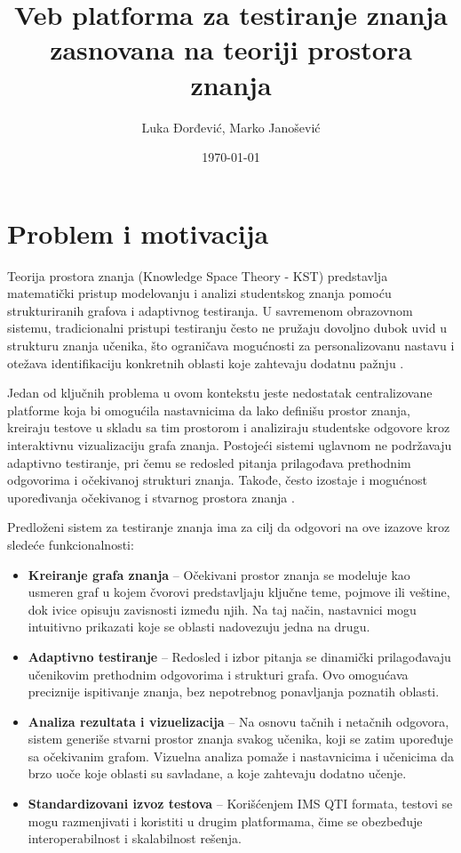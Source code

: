 \documentclass[conference]{IEEEtran}
\title{Veb platforma za testiranje znanja zasnovana na teoriji prostora znanja}
\author{Luka Đorđević, Marko Janošević}
\date{\today}
\begin{document}
\maketitle

\section{Problem i motivacija}

Teorija prostora znanja (Knowledge Space Theory - KST) predstavlja matematički pristup modelovanju i analizi studentskog znanja pomoću strukturiranih grafova i adaptivnog testiranja. U savremenom obrazovnom sistemu, tradicionalni pristupi testiranju često ne pružaju dovoljno dubok uvid u strukturu znanja učenika, što ograničava mogućnosti za personalizovanu nastavu i otežava identifikaciju konkretnih oblasti koje zahtevaju dodatnu pažnju \cite{falmagne2006}.

Jedan od ključnih problema u ovom kontekstu jeste nedostatak centralizovane platforme koja bi omogućila nastavnicima da lako definišu prostor znanja, kreiraju testove u skladu sa tim prostorom i analiziraju studentske odgovore kroz interaktivnu vizualizaciju grafa znanja. Postojeći sistemi uglavnom ne podržavaju adaptivno testiranje, pri čemu se redosled pitanja prilagođava prethodnim odgovorima i očekivanoj strukturi znanja. Takođe, često izostaje i mogućnost upoređivanja očekivanog i stvarnog prostora znanja \cite{doignon1999}.

Predloženi sistem za testiranje znanja ima za cilj da odgovori na ove izazove kroz sledeće funkcionalnosti:

\begin{itemize}
  \item \textbf{Kreiranje grafa znanja} – Očekivani prostor znanja se modeluje kao usmeren graf u kojem čvorovi predstavljaju ključne teme, pojmove ili veštine, dok ivice opisuju zavisnosti između njih. Na taj način, nastavnici mogu intuitivno prikazati koje se oblasti nadovezuju jedna na drugu.
  
  \item \textbf{Adaptivno testiranje} – Redosled i izbor pitanja se dinamički prilagođavaju učenikovim prethodnim odgovorima i strukturi grafa. Ovo omogućava preciznije ispitivanje znanja, bez nepotrebnog ponavljanja poznatih oblasti.
  
  \item \textbf{Analiza rezultata i vizuelizacija} – Na osnovu tačnih i netačnih odgovora, sistem generiše stvarni prostor znanja svakog učenika, koji se zatim upoređuje sa očekivanim grafom. Vizuelna analiza pomaže i nastavnicima i učenicima da brzo uoče koje oblasti su savladane, a koje zahtevaju dodatno učenje.
  
  \item \textbf{Standardizovani izvoz testova} – Korišćenjem IMS QTI formata, testovi se mogu razmenjivati i koristiti u drugim platformama, čime se obezbeđuje interoperabilnost i skalabilnost rešenja.
\end{itemize}
\end{document}
